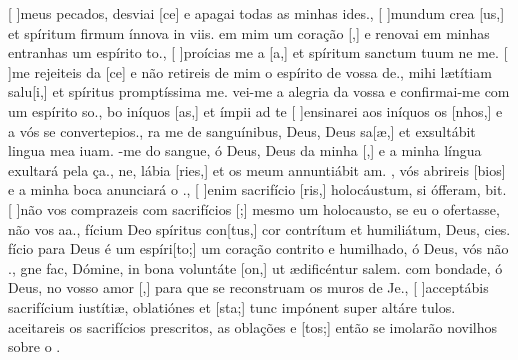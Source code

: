 {    {[ ]{meus} pecados, desviai [ce] e apagai todas as minhas ides.},
  {[ ]{mun}dum crea [us,] et spíritum firmum ínnova in viis.}%
    { em mim um coração [,] e renovai em minhas entranhas um espírito to.},
  {[ ]{pro}ícias me a [a,] et spíritum sanctum tuum ne  me.}%
    {[ ]{me} rejeiteis da [ce] e não retireis de mim o espírito de vossa de.},
  { mihi lætítiam salu[i,] et spíritus promptíssima me.}%
    {vei-me a alegria da vossa  e confir\-mai-me com um espírito so.},
  {bo iníquos [as,] et ímpii ad te }%
    {[ ]{en}sinarei aos iníquos os [nhos,] e a vós se convertepios.},
  {ra me de sanguínibus, Deus, Deus sa[æ,] et exsultábit lingua mea iuam.}%
    {-me do sangue, ó Deus, Deus da minha [,] e a minha língua exultará pela ça.},
  {ne, lábia [ries,] et os meum annuntiábit am.}%
    {, vós abrireis [bios] e a minha boca anunciará o .},
  {[ ]{e}nim sacrifício [ris,] holocáustum, si ófferam, bit.}%
    {[ ]{não} vos comprazeis com sacrifícios [;] mesmo um holocausto, se eu o ofertasse, não vos aa.},
  {fícium Deo spíritus con[tus,] cor contrítum et humiliátum, Deus, cies.}%
    {fício para Deus é um espíri[to;] um coração contrito e humilhado, ó Deus, vós não .},
  {gne fac, Dómine, in bona voluntáte [on,] ut ædificéntur salem.}%
    { com bondade, ó Deus, no vosso amor [,] para que se reconstruam os muros de Je.},
  {[ ]{ac}ceptábis sacrifícium iustítiæ, oblatiónes et [\-sta;] tunc impónent super altáre tu\-los.}%
    { aceitareis os sacrifícios prescritos, as oblações e [tos;] então se imolarão novilhos sobre o .}
}